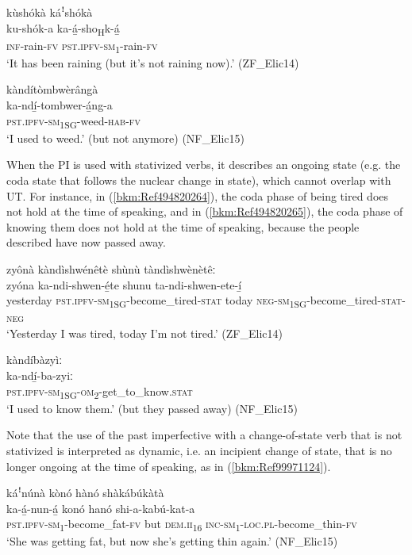\ea
\label{bkm:Ref494820165}
kùshókà káꜝshókà\\
\gll ku-shók-a  ka-á̲-sho\textsubscript{H}k-á̲\\
\textsc{inf}-rain-\textsc{fv}  \textsc{pst}.\textsc{ipfv}-\textsc{sm}\textsubscript{1}-rain-\textsc{fv}\\
\glt ‘It has been raining (but it’s not raining now).’ (ZF\_Elic14)
\z

\ea
\label{bkm:Ref494820164}
\glll kàndítòmbwèrângà\\
ka-ndí̲-tombwer-á̲ng-a\\
\textsc{pst}.\textsc{ipfv}-\textsc{sm}\textsubscript{1SG}-weed-\textsc{hab}-\textsc{fv}\\
\glt ‘I used to weed.’ (but not anymore) (NF\_Elic15)
\z

When the PI is used with stativized verbs, it describes an ongoing state (e.g. the coda state that follows the nuclear change in state), which cannot overlap with UT. For instance, in (\ref{bkm:Ref494820264}), the coda phase of being tired does not hold at the time of speaking, and in (\ref{bkm:Ref494820265}), the coda phase of knowing them does not hold at the time of speaking, because the people described have now passed away.

\ea
\label{bkm:Ref494820264}
zyônà kàndìshwénêtè shùnù tàndìshwènètêː\\
\gll zyóna    ka-ndi-shwen-é̲te shunu  ta-ndi-shwen-ete-í̲ \\
yesterday  \textsc{pst}.\textsc{ipfv}-\textsc{sm}\textsubscript{1SG}-become\_tired-\textsc{stat}
today  \textsc{neg}-\textsc{sm}\textsubscript{1SG}-become\_tired-\textsc{stat}-\textsc{neg}\\
\glt ‘Yesterday I was tired, today I’m not tired.’ (ZF\_Elic14)
\z

\ea
\label{bkm:Ref494820265}
\glll kàndíbàzyìː\\
ka-ndí̲-ba-zyiː\\
\textsc{pst}.\textsc{ipfv}-\textsc{sm}\textsubscript{1SG}-\textsc{om}\textsubscript{2}-get\_to\_know.\textsc{stat}\\
\glt ‘I used to know them.’ (but they passed away) (NF\_Elic15)
\z

Note that the use of the past imperfective with a change-of-state verb that is not stativized is interpreted as dynamic, i.e. an incipient change of state, that is no longer ongoing at the time of speaking, as in (\ref{bkm:Ref99971124}).

\ea
\label{bkm:Ref99971124}
káꜝnúnà kònó hànó shàkábúkàtà\\
\gll ka-á̲-nun-á̲        konó  hanó shi-a-kabú-kat-a \\
\textsc{pst}.\textsc{ipfv}-\textsc{sm}\textsubscript{1}-become\_fat-\textsc{fv}  but  \textsc{dem}.\textsc{ii}\textsubscript{16}
\textsc{inc}-\textsc{sm}\textsubscript{1}-\textsc{loc}.\textsc{pl}-become\_thin-\textsc{fv}\\
\glt ‘She was getting fat, but now she’s getting thin again.’ (NF\_Elic15)
\z
